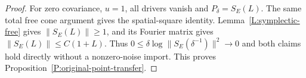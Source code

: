 \begin{proof}
  For zero covariance, $u=1$, all drivers vanish and $P_\delta=S_E(L)$.
  The same total free cone argument gives the spatial-square identity.
  Lemma~\ref{L:symplectic-free} gives $\|S_E(L)\|\ge1$,
  and its Fourier matrix gives $\|S_E(L)\|\le C(1+L)$.
  Thus $0\le\delta\log\|S_E(\delta^{-1})\|^2\to0$ and
  both claims hold directly without a nonzero-noise import.
  This proves Proposition~\ref{P:original-point-transfer}.
\end{proof}

